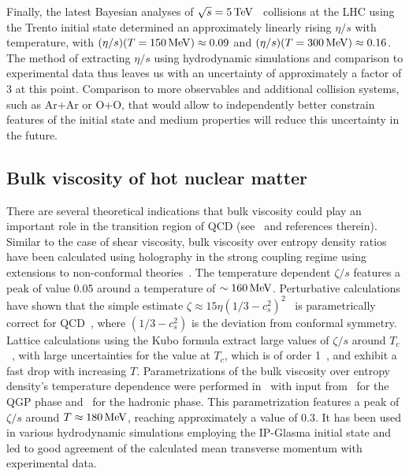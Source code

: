 Finally, the latest Bayesian analyses of $\sqrt{s}=5\,{\rm TeV}$ \pbpb\ 
  collisions at the LHC using the Trento initial state determined an 
  approximately linearly rising $\eta/s$ with temperature, with 
  $(\eta/s)(T=150\,{\rm MeV})\approx 0.09$ and 
  $(\eta/s)(T=300\,{\rm MeV})\approx 0.16$.
The method of extracting $\eta/s$ using hydrodynamic simulations and comparison 
  to experimental data thus leaves us with an uncertainty of approximately 
  a factor of $3$ at this point. 
Comparison to more observables and additional collision systems, such as Ar+Ar or O+O, 
  that would allow to independently better 
  constrain features of the initial state and medium properties will 
  reduce this uncertainty in the future. 


\subsection{Bulk viscosity of hot nuclear matter}
There are several theoretical indications that bulk viscosity could play 
  an important role in the transition region of QCD (see~\cite{Ryu:2017qzn} 
  and references therein). 
Similar to the case of shear viscosity, bulk viscosity over entropy density 
  ratios have been calculated using holography in the strong coupling regime 
  using extensions to non-conformal theories~\cite{Buchel:2007mf,Finazzo:2014cna}. 
The temperature dependent $\zeta/s$ features a peak of value 0.05 around a 
  temperature of $\sim 160\,{\rm MeV}$. 
Perturbative calculations have shown that the simple estimate 
  $\zeta\approx 15 \eta(1/3-c_s^2)^2$~\cite{Horsley:1985dz} is parametrically 
  correct for QCD~\cite{Arnold:2006fz}, where $(1/3-c_s^2)$ is the deviation 
  from conformal symmetry. 
Lattice calculations using the Kubo formula extract large values of $\zeta/s$ 
  around $T_c$~\cite{Karsch:2007jc,Meyer:2007dy}, with large uncertainties for 
  the value at $T_c$, which is of order 1~\cite{Kharzeev:2007wb}, and exhibit 
  a fast drop with increasing $T$.
Parametrizations of the bulk viscosity over entropy density's temperature 
  dependence were performed in~\cite{Denicol:2009am} with input from~\cite{Karsch:2007jc} 
  for the QGP phase and~\cite{NoronhaHostler:2008ju} for the hadronic phase. 
This parametrization features a peak of $\zeta/s$ around $T\approx 180\,{\rm MeV}$, 
  reaching approximately a value of 0.3. 
It has been used in various hydrodynamic simulations employing the IP-Glasma 
  initial state and led to good agreement of the calculated mean transverse 
  momentum with experimental data. 
